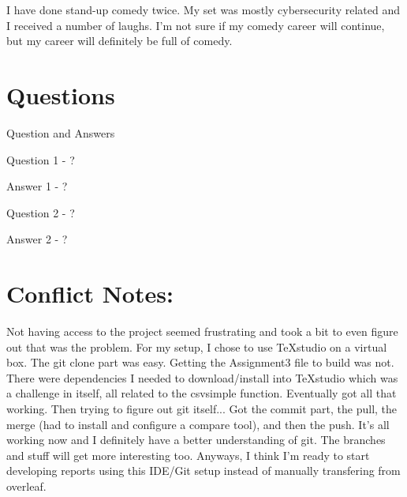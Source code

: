 	I have done stand-up comedy twice. My set was mostly cybersecurity related and I received a number of laughs. I'm not sure if my comedy career will continue, but my career will definitely be full of comedy. 
	

	
	
	
	\section{\textbf{Questions}}
	
	Question and Answers
	
	
	Question 1 - ?
	
	
	Answer 1 - ?

	
	Question 2 - ?
	
	
	Answer 2 - ?


	\section{\Merge Conflict Notes:}
	
	
	Not having access to the project seemed frustrating and took a bit to even figure out that was the problem. For my setup, I chose to use TeXstudio on a virtual box. The git clone part was easy. Getting the Assignment3 file to build was not. There were dependencies I needed to download/install into TeXstudio which was a challenge in itself, all related to the csvsimple function. Eventually got all that working. Then trying to figure out git itself... Got the commit part, the pull, the merge (had to install and configure a compare tool), and then the push. It's all working now and I definitely have a better understanding of git. The branches and stuff will get more interesting too. Anyways, I think I'm ready to start developing reports using this IDE/Git setup instead of manually transfering from overleaf.
		
	
%

 